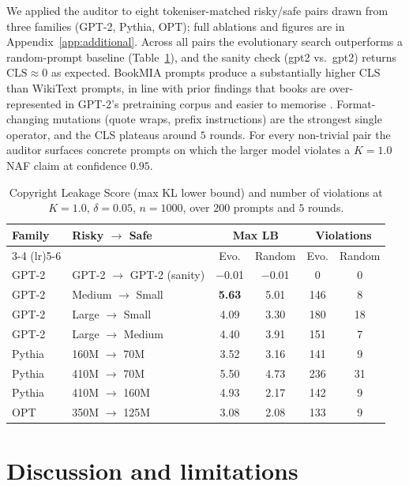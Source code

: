 \documentclass{article}
\begin{document}
We applied the auditor to eight tokeniser-matched risky/safe pairs drawn from three families (GPT-2, Pythia, OPT); full ablations and figures are in Appendix~\ref{app:additional}.  Across all pairs the evolutionary search outperforms a random-prompt baseline (Table~\ref{tab:modelpairs}), and the sanity check (gpt2 vs.\ gpt2) returns $\mathrm{CLS}\approx 0$ as expected.  BookMIA prompts produce a substantially higher CLS than WikiText prompts, in line with prior findings that books are over-represented in GPT-2's pretraining corpus and easier to memorise \cite{carlini2021extracting,shi2024bookmia}.  Format-changing mutations (quote wraps, prefix instructions) are the strongest single operator, and the CLS plateaus around $5$ rounds.  For every non-trivial pair the auditor surfaces concrete prompts on which the larger model violates a $K=1.0$ NAF claim at confidence $0.95$.

\begin{table}[t]
\centering
\caption{Copyright Leakage Score (max KL lower bound) and number of violations at $K=1.0$, $\delta=0.05$, $n=1000$, over $200$ prompts and $5$ rounds.}
\label{tab:modelpairs}
\small
\begin{tabular}{@{}llcccc@{}}
\toprule
\textbf{Family} & \textbf{Risky $\to$ Safe} & \multicolumn{2}{c}{\textbf{Max LB}} & \multicolumn{2}{c}{\textbf{Violations}} \\
\cmidrule(lr){3-4} \cmidrule(lr){5-6}
 & & Evo. & Random & Evo. & Random \\
\midrule
GPT-2 & GPT-2 $\to$ GPT-2 (sanity) & $-$0.01 & $-$0.01 & 0 & 0 \\
GPT-2 & Medium $\to$ Small & \textbf{5.63} & 5.01 & 146 & 8 \\
GPT-2 & Large $\to$ Small & 4.09 & 3.30 & 180 & 18 \\
GPT-2 & Large $\to$ Medium & 4.40 & 3.91 & 151 & 7 \\
\midrule
Pythia & 160M $\to$ 70M & 3.52 & 3.16 & 141 & 9 \\
Pythia & 410M $\to$ 70M & 5.50 & 4.73 & 236 & 31 \\
Pythia & 410M $\to$ 160M & 4.93 & 2.17 & 142 & 9 \\
\midrule
OPT & 350M $\to$ 125M & 3.08 & 2.08 & 133 & 9 \\
\bottomrule
\end{tabular}
\end{table}


\section{Discussion and limitations}
\label{sec:discussion}
\end{document}
